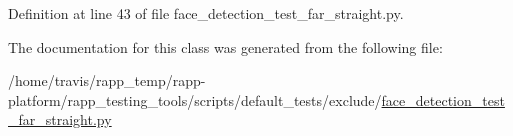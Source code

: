 Definition at line 43 of file face\-\_\-detection\-\_\-test\-\_\-far\-\_\-straight.\-py.



The documentation for this class was generated from the following file\-:\begin{DoxyCompactItemize}
\item 
/home/travis/rapp\-\_\-temp/rapp-\/platform/rapp\-\_\-testing\-\_\-tools/scripts/default\-\_\-tests/exclude/\hyperlink{face__detection__test__far__straight_8py}{face\-\_\-detection\-\_\-test\-\_\-far\-\_\-straight.\-py}\end{DoxyCompactItemize}
